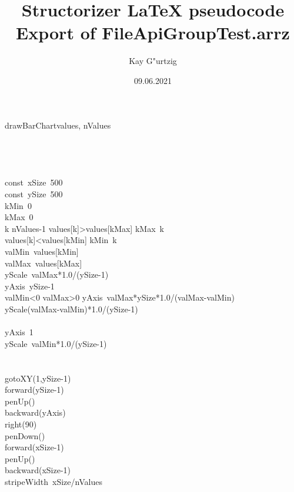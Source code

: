 \documentclass[a4paper,10pt]{article}
\title{Structorizer LaTeX pseudocode Export of FileApiGroupTest.arrz}
\author{Kay G"urtzig}
\date{09.06.2021}
\begin{document}
\begin{pseudocode}{drawBarChart}{values, nValues }
\label{drawBarChart}
\\
\\
\\
\\
  \\
  const\ xSize\gets\ 500\\
  const\ ySize\gets\ 500\\
  kMin\gets\ 0\\
  kMax\gets\ 0\\
  \FOR k  \TO nValues-1  \DO
    \IF values[k]>values[kMax] \THEN
      kMax\gets\ k\\
    \ELSE
      \IF values[k]<values[kMin] \THEN
        kMin\gets\ k\\
  valMin\gets\ values[kMin]\\
  valMax\gets\ values[kMax]\\
  yScale\gets\ valMax*1.0/(ySize-1)\\
  yAxis\gets\ ySize-1\\
  \IF valMin<0 \THEN
    \IF valMax>0 \THEN
    \BEGIN
      yAxis\gets\ valMax*ySize*1.0/(valMax-valMin)\\
      yScale\gets(valMax-valMin)*1.0/(ySize-1)\\
    \END\\
    \ELSE
    \BEGIN
      yAxis\gets\ 1\\
      yScale\gets\ valMin*1.0/(ySize-1)\\
    \END\\
  \\
  gotoXY(1,ySize-1)\\
  forward(ySize-1)\\
  penUp()\\
  backward(yAxis)\\
  right(90)\\
  penDown()\\
  forward(xSize-1)\\
  penUp()\\
  backward(xSize-1)\\
  stripeWidth\gets\ xSize/nValues\\

\end{pseudocode}
\end{document}
